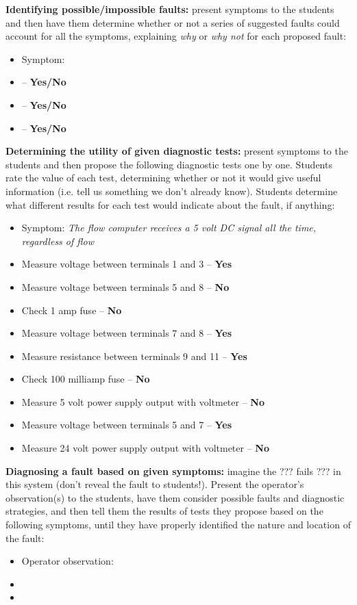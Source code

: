 \vskip 10pt


\noindent
{\bf Identifying possible/impossible faults:} present symptoms to the students and then have them determine whether or not a series of suggested faults could account for all the symptoms, explaining {\it why} or {\it why not} for each proposed fault:

\begin{itemize}
\item{} Symptom: {\it }
\item{}  -- {\bf Yes/No}
\item{}  -- {\bf Yes/No}
\item{}  -- {\bf Yes/No}
\end{itemize}


\vskip 10pt


\noindent
{\bf Determining the utility of given diagnostic tests:} present symptoms to the students and then propose the following diagnostic tests one by one.  Students rate the value of each test, determining whether or not it would give useful information (i.e. tell us something we don't already know).  Students determine what different results for each test would indicate about the fault, if anything:

\begin{itemize}
\item{} Symptom: {\it The flow computer receives a 5 volt DC signal all the time, regardless of flow}
\item{} Measure voltage between terminals 1 and 3 -- {\bf Yes}
\item{} Measure voltage between terminals 5 and 8 -- {\bf No}
\item{} Check 1 amp fuse -- {\bf No}
\item{} Measure voltage between terminals 7 and 8 -- {\bf Yes}
\item{} Measure resistance between terminals 9 and 11 -- {\bf Yes}
\item{} Check 100 milliamp fuse -- {\bf No}
\item{} Measure 5 volt power supply output with voltmeter -- {\bf No}
\item{} Measure voltage between terminals 5 and 7 -- {\bf Yes}
\item{} Measure 24 volt power supply output with voltmeter -- {\bf No}
\end{itemize}


\vskip 10pt


\noindent
{\bf Diagnosing a fault based on given symptoms:} imagine the ??? fails ??? in this system (don't reveal the fault to students!).  Present the operator's observation(s) to the students, have them consider possible faults and diagnostic strategies, and then tell them the results of tests they propose based on the following symptoms, until they have properly identified the nature and location of the fault:

\begin{itemize}
\item{} Operator observation: {\it }
\item{} 
\item{} 
\end{itemize}



